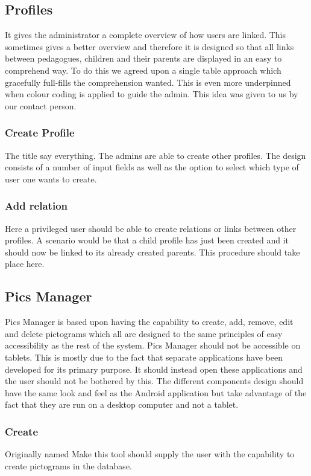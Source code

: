 \subsection{Profiles}
It gives the administrator a complete overview of how users are linked. This sometimes gives a better overview and therefore it is designed so that all links between pedagogues, children and their parents are displayed in an easy to comprehend way. To do this we agreed upon a single table approach which gracefully full-fills the comprehension wanted. This is even more underpinned when colour coding is applied to guide the admin. This idea was given to us by our contact person.

\subsubsection*{Create Profile}
The title say everything. The admins are able to create other profiles. The design consists of a number of input fields as well as the option to select which type of user one wants to create.

\subsubsection*{Add relation}
Here a privileged user should be able to create relations or links between other profiles. A scenario would be that a child profile has just been created and it should now be linked to its already created parents. This procedure should take place here.

\subsection{Pics Manager}
Pics Manager is based upon having the capability to create, add, remove, edit and delete pictograms which all are designed to the same principles of easy accessibility as the rest of the system. Pics Manager should not be accessible on tablets. This is mostly due to the fact that separate applications have been developed for its primary purpose. It should instead open these applications and the user should not be bothered by this. The different components design should have the same look and feel as the Android application but take advantage of the fact that they are run on a desktop computer and not a tablet.
\subsubsection*{Create}
Originally named Make this tool should supply the user with the capability to create pictograms in the database.
